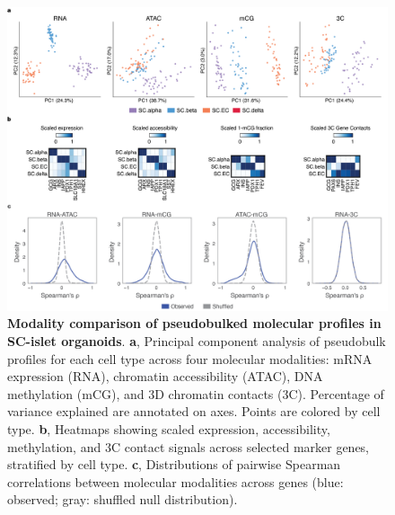 \begin{figure}[p]
    \centering
    \includegraphics[width=\textwidth]{3_figures-and-files/ExtendedFig2.png}
    \caption[Modality comparison of pseudobulked profiles]{\textbf{Modality comparison of pseudobulked molecular profiles in SC-islet organoids}. \textbf{a}, Principal component analysis of pseudobulk profiles for each cell type across four molecular modalities: mRNA expression (RNA), chromatin accessibility (ATAC), DNA methylation (mCG), and 3D chromatin contacts (3C). Percentage of variance explained are annotated on axes. Points are colored by cell type. \textbf{b}, Heatmaps showing scaled expression, accessibility, methylation, and 3C contact signals across selected marker genes, stratified by cell type. \textbf{c}, Distributions of pairwise Spearman correlations between molecular modalities across genes (blue: observed; gray: shuffled null distribution).}
    \label{fig:3 supplementary_2}
\end{figure}

